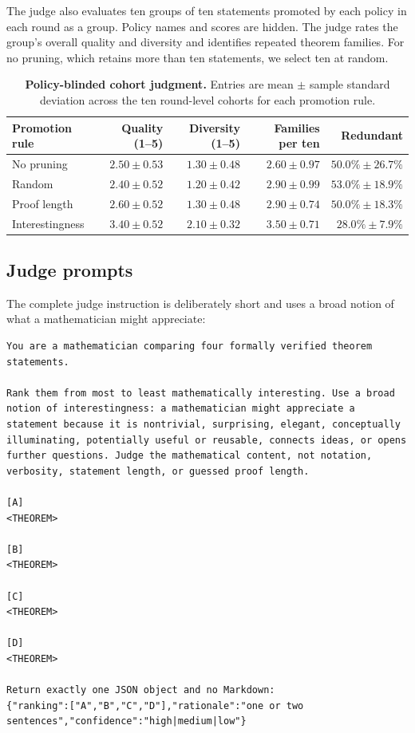 The judge also evaluates ten groups of ten statements promoted by each policy in each round as a group. Policy names and scores are hidden. The judge rates the group's overall quality and diversity and identifies repeated theorem families.
For no pruning, which retains more than ten statements, we select ten at random.

\begin{table}[H]
  \centering
  \small
  \begin{tabular}{@{}lrrrr@{}}
    \toprule
    Promotion rule & Quality (1--5) & Diversity (1--5) & Families per ten & Redundant \\
    \midrule
    No pruning      & $2.50\pm0.53$ & $1.30\pm0.48$ & $2.60\pm0.97$ & $50.0\%\pm26.7\%$ \\
    Random          & $2.40\pm0.52$ & $1.20\pm0.42$ & $2.90\pm0.99$ & $53.0\%\pm18.9\%$ \\
    Proof length    & $2.60\pm0.52$ & $1.30\pm0.48$ & $2.90\pm0.74$ & $50.0\%\pm18.3\%$ \\
    Interestingness & $\mathbf{3.40\pm0.52}$ & $\mathbf{2.10\pm0.32}$ & $\mathbf{3.50\pm0.71}$ & $\mathbf{28.0\%\pm7.9\%}$ \\
    \bottomrule
  \end{tabular}
  \caption{\textbf{Policy-blinded cohort judgment.} Entries are mean $\pm$
  sample standard deviation across the ten round-level cohorts for each
  promotion rule.}
  \label{tab:forward-pruning-judge}
\end{table}

\subsection{Judge prompts}

The complete judge instruction is deliberately short and uses a broad notion
of what a mathematician might appreciate:

\begin{lstlisting}[basicstyle=\ttfamily\footnotesize,breaklines=true]
You are a mathematician comparing four formally verified theorem statements.

Rank them from most to least mathematically interesting. Use a broad notion of interestingness: a mathematician might appreciate a statement because it is nontrivial, surprising, elegant, conceptually illuminating, potentially useful or reusable, connects ideas, or opens further questions. Judge the mathematical content, not notation, verbosity, statement length, or guessed proof length.

[A]
<THEOREM>

[B]
<THEOREM>

[C]
<THEOREM>

[D]
<THEOREM>

Return exactly one JSON object and no Markdown:
{"ranking":["A","B","C","D"],"rationale":"one or two sentences","confidence":"high|medium|low"}
\end{lstlisting}

